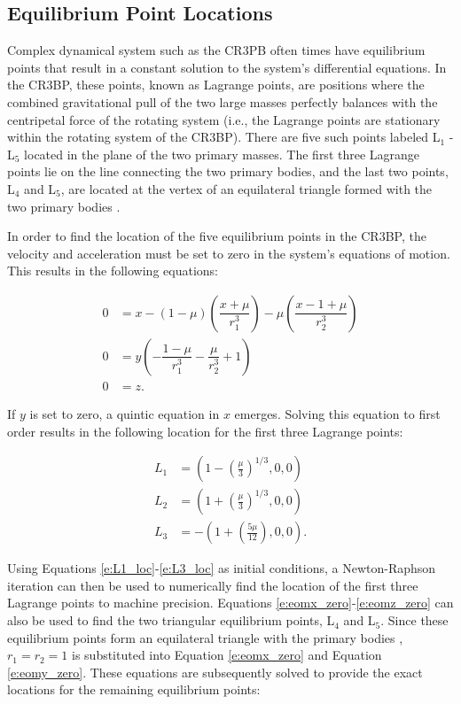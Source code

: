 \documentclass[11pt]{article} %
\begin{document}
\subsection{Equilibrium Point Locations}
Complex dynamical system such as the CR3PB often times have equilibrium points that result in a constant solution to the system's differential equations. In the CR3BP, these points, known as Lagrange points, are positions where the combined gravitational pull of the two large masses perfectly balances with the centripetal force of the rotating system (i.e., the Lagrange points are stationary within the rotating system of the CR3BP). There are five such points labeled L$_1$ - L$_5$ located in the plane of the two primary masses. The first three Lagrange points lie on the line connecting the two primary bodies, and the last two points, L$_4$ and L$_5$, are located at the vertex of an equilateral triangle formed with the two primary bodies \cite{KoonLoMarsdenRoss2011}.

In order to find the location of the five equilibrium points in the CR3BP, the velocity and acceleration must be set to zero in the system's equations of motion. This results in the following equations:

\begin{align}
	0 & = x - (1-\mu)\left(\dfrac{x+\mu}{r_1^3}\right) - \mu\left(\dfrac{x-1+\mu}{r_2^3}\right) \label{e:eomx_zero}\\
	0 & = y\left(-\dfrac{1-\mu}{r_1^3} - \dfrac{\mu}{r_2^3} + 1\right) \label{e:eomy_zero}\\
	0 & = z. \label{e:eomz_zero}
\end{align}

\noindent
If $y$ is set to zero, a quintic equation in $x$ emerges. Solving this equation to first order results in the following location for the first three Lagrange points:

\begin{align}
	L_1 &= \left(1-\left(\frac{\mu}{3}\right)^{1/3},0,0\right)\label{e:L1_loc}\\
	L_2 &= \left(1+\left(\frac{\mu}{3}\right)^{1/3},0,0\right)\label{e:L2_loc}\\
	L_3 &= -\left(1+\left(\frac{5\mu}{12}\right),0,0\right). \label{e:L3_loc}
\end{align}

\noindent
Using Equations \ref{e:L1_loc}-\ref{e:L3_loc} as initial conditions, a Newton-Raphson iteration can then be used to numerically find the location of the first three Lagrange points to machine precision. Equations \ref{e:eomx_zero}-\ref{e:eomz_zero} can also be used to find the two triangular equilibrium points, L$_4$ and L$_5$. Since these equilibrium points form an equilateral triangle with the primary bodies \cite{KoonLoMarsdenRoss2011m an }, $r_1 = r_2 = 1$ is substituted into Equation \ref{e:eomx_zero} and Equation \ref{e:eomy_zero}. These equations are subsequently solved to provide the exact locations for the remaining equilibrium points:
\end{document}
